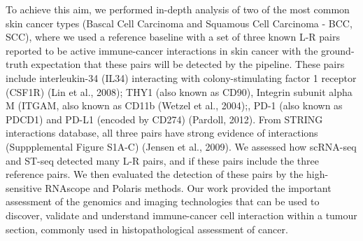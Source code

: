 To achieve this aim, we performed in-depth analysis of two of the most common skin cancer types (Bascal Cell Carcinoma and Squamous Cell Carcinoma - BCC, SCC), where we used a reference baseline with a set of three known L-R pairs reported to be active immune-cancer interactions in skin cancer with the ground-truth expectation that these pairs will be detected by the pipeline. These pairs include interleukin-34 (IL34) interacting with colony-stimulating factor 1 receptor (CSF1R) (Lin et al., 2008);  THY1 (also known as CD90), Integrin subunit alpha M (ITGAM, also known as CD11b (Wetzel et al., 2004);, PD-1 (also known as PDCD1) and PD-L1 (encoded by CD274) (Pardoll, 2012). From STRING interactions database, all three pairs have strong evidence of interactions (Suppplemental Figure S1A-C) (Jensen et al., 2009). We assessed how scRNA-seq and ST-seq detected many L-R pairs, and if these pairs include the three reference pairs. We then evaluated the detection of these pairs by the high-sensitive RNAscope and Polaris methods. Our work provided the important assessment of the genomics and imaging technologies that can be used to discover, validate and understand immune-cancer cell interaction within a tumour section, commonly used in histopathological assessment of cancer. 
